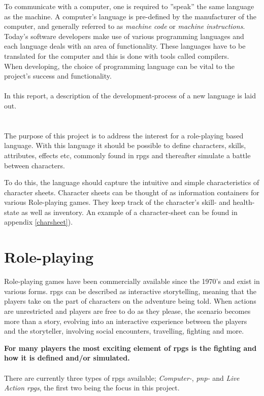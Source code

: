 
To communicate with a computer, one is required to ''speak'' the same language as the machine. A computer's language is pre-defined by the manufacturer of the computer, and generally referred to as \emph{machine code} or \emph{machine instructions}.\\
Today's software developers make use of various programming languages and each language deals with an area of functionality. These languages have to be translated for the computer and this is done with tools called compilers.\\
When developing, the choice of programming language can be vital to the project's success and functionality.\\\\
In this report, a description of the development-process of a new language is laid out.

\section{\langname{}}
The purpose of this project is to address the interest for a role-playing based language. With this language it should be possible to define characters, skills, attributes, effects etc, commonly found in \ac{rpgs} and thereafter simulate a battle between characters.

To do this, the language should capture the intuitive and simple characteristics of character sheets. Character sheets can be thought of as information containers for various Role-playing games. They keep track of the character's skill- and health-state as well as inventory. An example of a character-sheet can be found in appendix \vref{charsheet}).

\section{Role-playing}
Role-playing games have been commercially available since the 1970's and exist in various forms. \ac{rpgs} can be described as interactive storytelling, meaning that the players take on the part of characters on the adventure being told. When actions are unrestricted and players are free to do as they please, the scenario becomes more than a story, evolving into an interactive experience between the players and the storyteller, involving social encounters, travelling, fighting and more.

\textbf{For many players the most exciting element of \ac{rpgs} is the fighting and how it is defined and/or simulated.}
\\\\
There are currently three types of \ac{rpgs} available; \emph{Computer-}, \emph{\ac{pnp}-} and \emph{Live Action \ac{rpgs}}, the first two being the focus in this project.

